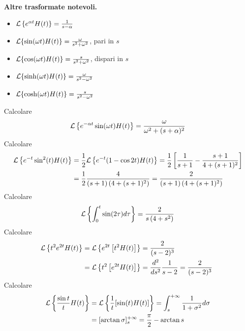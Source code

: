 \textbf{Altre trasformate notevoli.}
\begin{itemize}
\item $\mathcal{L}\left\{e^{\alpha t} H(t)\right\} = \frac{1}{s - \alpha }$
\item $\mathcal{L}\{\sin(\omega t) H(t)\} = \frac{\omega }{s^{2} + \omega ^{2}}$, pari in $s$
\item $\mathcal{L}\{\cos(\omega t) H(t)\} = \frac{s}{s^{2} + \omega ^{2}}$, dispari in $s$
\item $\mathcal{L}\{\sinh(\omega t) H(t)\} = \frac{\omega }{s^{2} - \omega ^{2}}$
\item $\mathcal{L}\{\cosh(\omega t) H(t)\} = \frac{s}{s^{2} - \omega ^{2}}$
\end{itemize}
\Esercizio{}

Calcolare
\begin{equation*}
\mathcal{L}\left\{e^{ - \alpha t}\sin(\omega t) H(t)\right\} = \frac{\omega }{\omega ^{2} + (s + \alpha)^{2}}
\end{equation*}
Calcolare
\begin{equation*}
\begin{aligned}
\mathcal{L}\left\{e^{ - t}\sin^{2}(t) H(t)\right\} & = \frac{1}{2}\mathcal{L}\left\{e^{ - t}(1 - \cos 2t) H(t)\right\} = \frac{1}{2}\left[\frac{1}{s + 1} - \frac{s + 1}{4 + (s + 1)^{2}}\right]\\
 & = \frac{1}{2}\frac{4}{(s + 1)\left(4 + (s + 1)^{2}\right)} = \frac{2}{(s + 1)\left(4 + (s + 1)^{2}\right)}
\end{aligned}
\end{equation*}
Calcolare
\begin{equation*}
\mathcal{L}\left\{\int ^{t}_{0}\sin(2\tau) d\tau \right\} = \frac{2}{s\left(4 + s^{2}\right)}
\end{equation*}
Calcolare
\begin{equation*}
\begin{aligned}
\Lc\left\{t^{2} e^{2t} H(t)\right\} & = \Lc\left\{e^{2t}\left[ t^{2} H(t)\right]\right\} = \frac{2}{(s - 2)^{3}}\\
 & = \Lc\left\{t^{2}\left[ e^{2t} H(t)\right]\right\} = \frac{d^{2}}{ds^{2}}\frac{1}{s - 2} = \frac{2}{(s - 2)^{3}} \ 
\end{aligned}
\end{equation*}
Calcolare
\begin{equation*}
\begin{aligned}
\mathcal{L}\left\{\frac{\sin t}{t} H(t)\right\} & = \mathcal{L}\left\{\frac{1}{t}[\sin(t) H(t)]\right\} = \int ^{ + \infty }_{s}\frac{1}{1 + \sigma ^{2}} d\sigma \\
 & = [\arctan \sigma ]^{ + \infty }_{s} = \frac{\pi }{2} - \arctan s
\end{aligned}
\end{equation*}
\Esercizio{}

